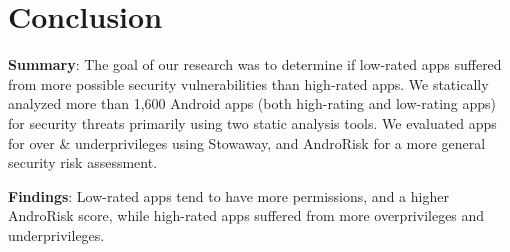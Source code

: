 \documentclass{sig-alternate}
\begin{document}










\section{Conclusion}
\label{sec:conclusion}

\noindent \textbf{Summary}:
The goal of our research was to determine if low-rated apps suffered from more possible security vulnerabilities than high-rated apps. We statically analyzed more than 1,600 Android apps (both high-rating and low-rating apps) for security threats primarily using two static analysis tools. We evaluated apps for over \& underprivileges using Stowaway, and AndroRisk for a more general security risk assessment.

\noindent \textbf{Findings}: Low-rated apps tend to have more permissions, and a higher AndroRisk score, while high-rated apps suffered from more overprivileges and underprivileges.



\end{document}
